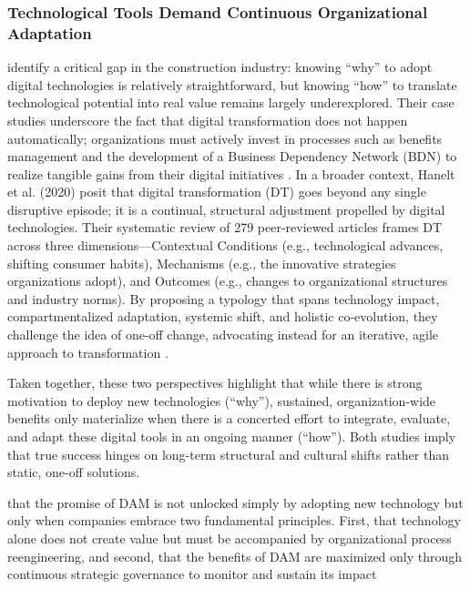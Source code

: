 \documentclass[a4paper,10pt,twocolumn]{article}
\numberwithin{figure}{section}
\numberwithin{table}{section}
\begin{document}
\vspace{0.3cm}
\subsubsection{Technological Tools Demand Continuous Organizational Adaptation}
\vspace{0.3cm}

\cite{LOVE2019102930} identify a critical gap in the construction industry: knowing “why” 
to adopt digital technologies is relatively straightforward, but knowing “how” to translate 
technological potential into real value remains largely underexplored. Their case studies underscore 
the fact that digital transformation does not happen automatically; organizations must actively
 invest in processes such as benefits management and the development of a Business Dependency 
 Network (BDN) to realize tangible gains from their digital initiatives \citep{LOVE2019102930}.
In a broader context, Hanelt et al. (2020) posit that digital transformation (DT) goes beyond 
any single disruptive episode; it is a continual, structural adjustment propelled by digital 
technologies. Their systematic review of 279 peer-reviewed articles frames DT across three 
dimensions—Contextual Conditions (e.g., technological advances, shifting consumer habits), 
Mechanisms (e.g., the innovative strategies organizations adopt), and Outcomes 
(e.g., changes to organizational structures and industry norms). By proposing 
a typology that spans technology impact, compartmentalized adaptation, systemic 
shift, and holistic co‐evolution, they challenge the idea of one-off change, 
advocating instead for an iterative, agile approach to transformation \citep{Haneltarticle}.

\vspace{0.3cm}
Taken together, these two perspectives highlight that while there is strong motivation to 
deploy new technologies (“why”), sustained, organization-wide benefits only materialize 
when there is a concerted effort to integrate, evaluate, and adapt these digital tools 
in an ongoing manner (“how”). Both studies imply that true success hinges on long-term 
structural and cultural shifts rather than static, one-off solutions.

that the promise of DAM
is not unlocked simply by adopting new technology but only when companies embrace two 
fundamental principles. First, that technology alone does not create value but must be accompanied by 
organizational process reengineering, and second, that the benefits of DAM 
are maximized only through continuous strategic governance to monitor and sustain its impact 
\end{document}
